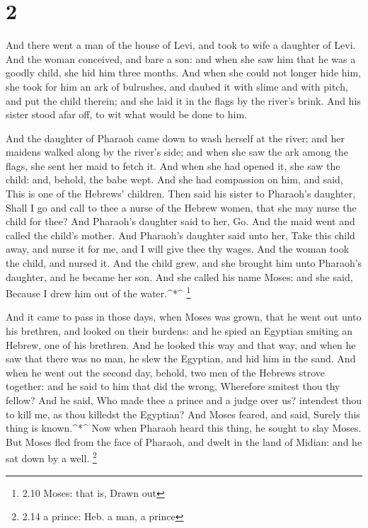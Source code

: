 \hypertarget{section-1}{%
\section{2}\label{section-1}}

 And there went a man of the house of Levi, and took to wife
a daughter of Levi.  And the woman conceived, and bare a
son: and when she saw him that he was a goodly child, she hid him three
months.  And when she could not longer hide him, she took
for him an ark of bulrushes, and daubed it with slime and with pitch,
and put the child therein; and she laid it in the flags by the river's
brink.  And his sister stood afar off, to wit what would be
done to him.

 And the daughter of Pharaoh came down to wash herself at
the river; and her maidens walked along by the river's side; and when
she saw the ark among the flags, she sent her maid to fetch it.
 And when she had opened it, she saw the child: and, behold,
the babe wept. And she had compassion on him, and said, This is one of
the Hebrews' children.  Then said his sister to Pharaoh's
daughter, Shall I go and call to thee a nurse of the Hebrew women, that
she may nurse the child for thee?  And Pharaoh's daughter
said to her, Go. And the maid went and called the child's mother.
 And Pharaoh's daughter said unto her, Take this child away,
and nurse it for me, and I will give thee thy wages. And the woman took
the child, and nursed it.  And the child grew, and she
brought him unto Pharaoh's daughter, and he became her son. And she
called his name Moses: and she said, Because I drew him out of the
water.\^{}*\^{} \footnote{2.10 Moses: that is, Drawn out}

 And it came to pass in those days, when Moses was grown,
that he went out unto his brethren, and looked on their burdens: and he
spied an Egyptian smiting an Hebrew, one of his brethren. 
And he looked this way and that way, and when he saw that there was no
man, he slew the Egyptian, and hid him in the sand.  And
when he went out the second day, behold, two men of the Hebrews strove
together: and he said to him that did the wrong, Wherefore smitest thou
thy fellow?  And he said, Who made thee a prince and a
judge over us? intendest thou to kill me, as thou killedst the Egyptian?
And Moses feared, and said, Surely this thing is known.\^{}*\^{}
 Now when Pharaoh heard this thing, he sought to slay
Moses. But Moses fled from the face of Pharaoh, and dwelt in the land of
Midian: and he sat down by a well. \footnote{2.14 a prince: Heb. a man,
  a prince}

